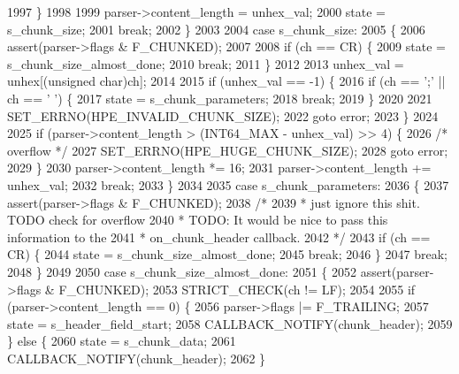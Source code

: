 \begin{DoxyCode}
1997         \}
1998 
1999         parser->content_length = unhex\_val;
2000         state = s_chunk_size;
2001         \textcolor{keywordflow}{break};
2002       \}
2003 
2004       \textcolor{keywordflow}{case} s_chunk_size:
2005       \{
2006         assert(parser->flags & F_CHUNKED);
2007 
2008         \textcolor{keywordflow}{if} (ch == CR) \{
2009           state = s_chunk_size_almost_done;
2010           \textcolor{keywordflow}{break};
2011         \}
2012 
2013         unhex\_val = unhex[(\textcolor{keywordtype}{unsigned} char)ch];
2014 
2015         \textcolor{keywordflow}{if} (unhex\_val == -1) \{
2016           \textcolor{keywordflow}{if} (ch == \textcolor{charliteral}{';'} || ch == \textcolor{charliteral}{' '}) \{
2017             state = s_chunk_parameters;
2018             \textcolor{keywordflow}{break};
2019           \}
2020 
2021           SET_ERRNO(HPE_INVALID_CHUNK_SIZE);
2022           \textcolor{keywordflow}{goto} error;
2023         \}
2024 
2025         \textcolor{keywordflow}{if} (parser->content_length > (INT64\_MAX - unhex\_val) >> 4) \{
2026           \textcolor{comment}{/* overflow */}
2027           SET_ERRNO(HPE_HUGE_CHUNK_SIZE);
2028           \textcolor{keywordflow}{goto} error;
2029         \}
2030         parser->content_length *= 16;
2031         parser->content_length += unhex\_val;
2032         \textcolor{keywordflow}{break};
2033       \}
2034 
2035       \textcolor{keywordflow}{case} s_chunk_parameters:
2036       \{
2037         assert(parser->flags & F_CHUNKED);
2038         \textcolor{comment}{/*}
2039 \textcolor{comment}{         * just ignore this shit. TODO check for overflow}
2040 \textcolor{comment}{         * TODO: It would be nice to pass this information to the}
2041 \textcolor{comment}{         * on\_chunk\_header callback.}
2042 \textcolor{comment}{         */}
2043         \textcolor{keywordflow}{if} (ch == CR) \{
2044           state = s_chunk_size_almost_done;
2045           \textcolor{keywordflow}{break};
2046         \}
2047         \textcolor{keywordflow}{break};
2048       \}
2049 
2050       \textcolor{keywordflow}{case} s_chunk_size_almost_done:
2051       \{
2052         assert(parser->flags & F_CHUNKED);
2053         STRICT_CHECK(ch != LF);
2054 
2055         \textcolor{keywordflow}{if} (parser->content_length == 0) \{
2056           parser->flags |= F_TRAILING;
2057           state = s_header_field_start;
2058           CALLBACK_NOTIFY(chunk\_header);
2059         \} \textcolor{keywordflow}{else} \{
2060           state = s_chunk_data;
2061           CALLBACK_NOTIFY(chunk\_header);
2062         \}

\end{DoxyCode}
